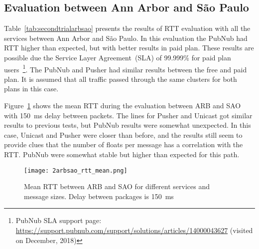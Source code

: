 \subsection*{Evaluation between Ann Arbor and São Paulo} 

Table~\ref{tab:secondtrialarbsao} presents the results of RTT evaluation with all the services between Ann Arbor and São Paulo.
In this evaluation the PubNub had RTT higher than expected, but with better results in paid plan.
These results are possible due the Service Layer Agreement~(SLA) of 99.999\% for paid plan users~\footnote{PubNub SLA support page: \url{https://support.pubnub.com/support/solutions/articles/14000043627} (visited on December, 2018)}. 
The PubNub and Pusher had similar results between the free and paid plan.
It is assumed that all traffic passed through the same clusters for both plans in this case.

Figure~\ref{fig:second-arb-sao-rtt} shows the mean RTT during the evaluation between ARB and SAO with 150~ms delay between packets.
The lines for Pusher and Unicast got similar results to previous tests, but PubNub results were somewhat unexpected.
In this case, Unicast and Pusher were closer than before, and the results still seem to provide clues that the number of floats per message has a correlation with the RTT.
PubNub were somewhat stable but higher than expected for this path.

\begin{figure}[!ht]
	\centering
	\texttt{[image: 2arbsao\_rtt\_mean.png]}
	\caption{Mean RTT between ARB and SAO for different services and message sizes. Delay between packages is 150~ms}
	\label{fig:second-arb-sao-rtt}
\end{figure}

